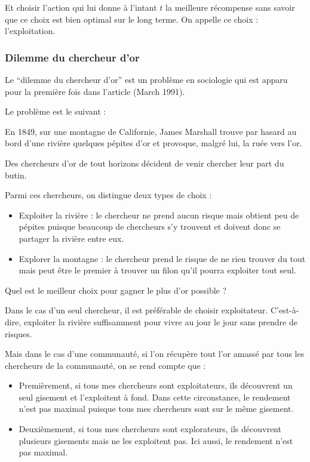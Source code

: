 \documentclass[
12pt,
french,
]{article}
\begin{document}
Et choisir l'action qui lui donne à l'intant \(t\) la meilleure
récompense sans savoir que ce choix est bien optimal sur le long terme.
On appelle ce choix : l'exploitation.

\hypertarget{dilemme-du-chercheur-dor}{%
\subsubsection{Dilemme du chercheur
d'or}\label{dilemme-du-chercheur-dor}}

Le ``dilemme du chercheur d'or'' est un problème en sociologie qui est
apparu pour la première fois dans l'article (March 1991).

Le problème est le suivant :

En 1849, sur une montagne de Californie, James Marshall trouve par
hasard au bord d'une rivière quelques pépites d'or et provoque, malgré
lui, la ruée vers l'or.

Des chercheurs d'or de tout horizons décident de venir chercher leur
part du butin.

Parmi ces chercheurs, on distingue deux types de choix :

\begin{itemize}
\item
  Exploiter la rivière : le chercheur ne prend aucun risque mais obtient
  peu de pépites puisque beaucoup de chercheurs s'y trouvent et doivent
  donc se partager la rivière entre eux.
\item
  Explorer la montagne : le chercheur prend le risque de ne rien trouver
  du tout mais peut être le premier à trouver un filon qu'il pourra
  exploiter tout seul.
\end{itemize}

Quel est le meilleur choix pour gagner le plus d'or possible ?

Dans le cas d'un seul chercheur, il est préférable de choisir
exploitateur. C'est-à-dire, exploiter la rivière suffisamment pour vivre
au jour le jour sans prendre de risques.

Mais dans le cas d'une communauté, si l'on récupère tout l'or amassé par
tous les chercheurs de la communauté, on se rend compte que :

\begin{itemize}
\item
  Premièrement, si tous mes chercheurs sont exploitateurs, ils
  découvrent un seul gisement et l'exploitent à fond. Dans cette
  circonstance, le rendement n'est pas maximal puisque tous mes
  chercheurs sont sur le même gisement.
\item
  Deuxièmement, si tous mes chercheurs sont explorateurs, ils découvrent
  plusieurs gisements mais ne les exploitent pas. Ici aussi, le
  rendement n'est pas maximal.
\end{itemize}
\end{document}
